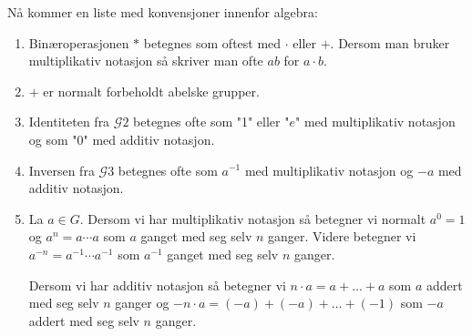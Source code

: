 Nå kommer en liste med konvensjoner innenfor algebra:
\begin{enumerate}
	\item Binæroperasjonen $*$ betegnes som oftest med $\cdot$ eller $+$. Dersom man
	      bruker multiplikativ notasjon så skriver man ofte $ab$ for $a\cdot b$.
	\item $+$ er normalt forbeholdt abelske grupper.
	\item Identiteten fra $\mathscr{G}2$ betegnes ofte som "1" eller "$e$" med
	      multiplikativ notasjon og som "0" med additiv notasjon.
	\item Inversen fra $\mathscr{G}3$ betegnes ofte som $a^{-1}$ med multiplikativ
	      notasjon og $-a$ med additiv notasjon.
	\item La $a\in G$. Dersom vi har multiplikativ notasjon så betegner vi normalt
	      $a^0 = 1$ og $a^n = a\cdots a$ som $a$ ganget med seg selv $n$ ganger. Videre
	      betegner vi $a^{-n} = a^{-1}\cdots a^{-1}$ som $a^{-1}$ ganget med seg selv $n$
	      ganger.

	      Dersom vi har additiv notasjon så betegner vi $n\cdot a = a + \dots + a$ som $a$
	      addert med seg selv $n$ ganger og $-n\cdot a = (-a) + (-a) + \dots + (-1)$ som
	      $-a$ addert med seg selv $n$ ganger.
\end{enumerate}
